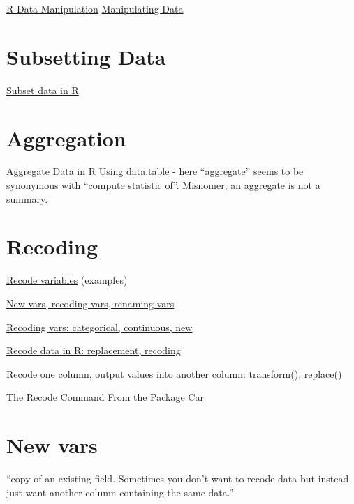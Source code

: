 \documentclass[reqno,12pt]{tufte-book}
\numberwithin{equation}{subsection}
\begin{document}
\href{http://rprogramming.net/r-data-manipulation/}{R Data Manipulation}
\href{http://www.cookbook-r.com/Manipulating\_data/}{Manipulating Data}

\section{Subsetting Data}
\label{sect:datasubsetting}

\href{http://rprogramming.net/subset-data-in-r/}{Subset data in R}

\section{Aggregation}
\label{sect:dataaggregate}

\href{http://rprogramming.net/aggregate-data-in-r-using-data-table/}{Aggregate
  Data in R Using data.table} - here ``aggregate'' seems to be
synonymous with ``compute statistic of''.  Misnomer; an aggregate is not a summary.

\section{Recoding}
\label{sect:recodingr}

\href{http://www.uni-kiel.de/psychologie/rexrepos/posts/recode.html}{Recode variables} (examples)

\href{http://www.statmethods.net/management/variables.html}{New vars, recoding vars, renaming vars}

\href{http://www.cookbook-r.com/Manipulating\_data/Recoding\_data/}{Recoding vars: categorical, continuous, new}

\href{http://rprogramming.net/recode-data-in-r/}{Recode data in R: replacement, recoding}

\href{http://rwiki.sciviews.org/doku.php?id=tips:data-frames:recode_column}{Recode one column, output values into another column: transform(), replace()}

\href{http://rprogramming.net/recode-data-in-r/}{The Recode Command From the Package Car}

\section{New vars}
\label{sect:newvars}

``copy of an existing field. Sometimes you don’t want to recode data but instead just want another column containing the same data.''
\end{document}

